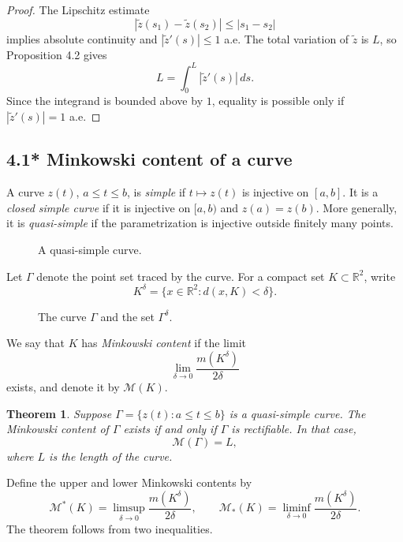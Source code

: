 \documentclass[11pt,openany]{book}
\newtheorem{theorem}{Theorem}[section]
\begin{document}
\begin{proof}
The Lipschitz estimate
\[
|\widetilde z(s_1)-\widetilde z(s_2)|\le|s_1-s_2|
\]
implies absolute continuity and $|\widetilde z'(s)|\le1$ a.e. The total variation of $\widetilde z$ is $L$, so Proposition 4.2 gives
\[
L=\int_0^L|\widetilde z'(s)|\,ds.
\]
Since the integrand is bounded above by $1$, equality is possible only if $|\widetilde z'(s)|=1$ a.e.
\end{proof}

\subsection*{4.1* Minkowski content of a curve}

A curve $z(t)$, $a\le t\le b$, is \emph{simple} if $t\mapsto z(t)$ is injective on $[a,b]$. It is a \emph{closed simple curve} if it is injective on $[a,b)$ and $z(a)=z(b)$. More generally, it is \emph{quasi-simple} if the parametrization is injective outside finitely many points.

\begin{figure}[ht]
\centering
{}
\caption{A quasi-simple curve.}
\end{figure}

Let $\Gamma$ denote the point set traced by the curve. For a compact set $K\subset\mathbb R^2$, write
\[
K^\delta=\{x\in\mathbb R^2:d(x,K)<\delta\}.
\]

\begin{figure}[ht]
\centering
{}
\caption{The curve $\Gamma$ and the set $\Gamma^\delta$.}
\end{figure}

We say that $K$ has \emph{Minkowski content} if the limit
\[
\lim_{\delta\to0}\frac{m(K^\delta)}{2\delta}
\]
exists, and denote it by $\mathcal M(K)$.

\begin{theorem}
Suppose $\Gamma=\{z(t):a\le t\le b\}$ is a quasi-simple curve. The Minkowski content of $\Gamma$ exists if and only if $\Gamma$ is rectifiable. In that case,
\[
\mathcal M(\Gamma)=L,
\]
where $L$ is the length of the curve.
\end{theorem}

Define the upper and lower Minkowski contents by
\[
\mathcal M^*(K)=\limsup_{\delta\to0}\frac{m(K^\delta)}{2\delta},
\qquad
\mathcal M_*(K)=\liminf_{\delta\to0}\frac{m(K^\delta)}{2\delta}.
\]
The theorem follows from two inequalities.
\end{document}

